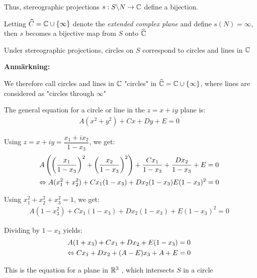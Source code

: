 \par\bigskip
\noindent Thus, stereographic projections $s:S\backslash N\to\mathbb{C}$ define a bijection.
\par\bigskip
\noindent Letting $\widehat{C} = \mathbb{C}\cup\left\{\infty\right\}$ denote the \textit{extended complex plane} and define $s(N) = \infty$, then $s$ becomes a bijective map from $S$ onto $\widehat{\mathbb{C}}$
\par\bigskip
\begin{theo}[]{}
  Under stereographic projections, circles on $S$ correspond to circles and lines in $\mathbb{C}$
\end{theo}
\par\bigskip
\noindent\textbf{Anmärkning:}\par
\noindent We therefore call circles and lines in $\mathbb{C}$ "circles" in $\widehat{\mathbb{C}} = \mathbb{C}\cup\left\{\infty\right\}$, where lines are considered as "circles through $\infty$"
\newpage
\begin{prf}[]{}
  The general equation for a circle or line in the $z = x+iy$ plane is:
  \begin{equation*}
    \begin{gathered}
      A(x^2+y^2)+Cx+Dy+E = 0
    \end{gathered}
  \end{equation*}
  \par\bigskip
  \noindent Using $z = x+iy = \dfrac{x_1+ix_2}{1-x_3}$, we get:
  \begin{equation*}
    \begin{gathered}
      A\left(\left(\dfrac{x_1}{1-x_3}\right)^2+\left(\dfrac{x_2}{1-x_3}\right)^2\right)+\dfrac{Cx_1}{1-x_3}+\dfrac{Dx_2}{1-x_3}+E=0\\
      \Leftrightarrow A(x_1^2+x_2^2)+Cx_1(1-x_3)+Dx_2(1-x_3)E(1-x_3)^2=0
    \end{gathered}
  \end{equation*}
  \par\bigskip
  \noindent Using $x_1^2+x_2^2+x_3^2=1$, we get:
  \begin{equation*}
    \begin{gathered}
      A(1-x_3^2)+Cx_1(1-x_3)+Dx_2(1-x_3)+E(1-x_3)^2 = 0
    \end{gathered}
  \end{equation*}
  \par\bigskip
  \noindent Dividing by $1-x_3$ yields:
  \begin{equation*}
    \begin{gathered}
      A(1+x_3)+Cx_1+Dx_2+E(1-x_3)=0\\
      \Leftrightarrow Cx_1+Dx_2+(A-E)x_3+A+E=0
    \end{gathered}
  \end{equation*}
  \par\bigskip
  \noindent This is the equation for a plane in $\mathbb{R}^3$ , which intersects $S$ in a circle
\end{prf}
\par\bigskip
